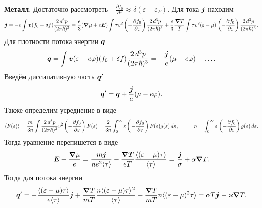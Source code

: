 \textbf{Металл}. Достаточно рассмотреть $- \frac{\partial f_0}{\partial \varepsilon} \approx \delta(\varepsilon - \varepsilon_F)$. Для тока $\boldsymbol{j}$ находим
\begin{equation*}
	\boldsymbol{j} = - e \int \boldsymbol{v} (f_0 + \delta f) \frac{2 \, d^3 p}{(2\pi \hbar)^3} = \frac{e}{3} (\boldsymbol{\nabla} \mu + e \boldsymbol{E}) \int \tau v^2 \left(
		- \frac{\partial f_0}{\partial \varepsilon} 
	\right) \frac{2 \, d^3 p}{(2\pi \hbar)^3} + \frac{e}{3} \frac{\boldsymbol{\nabla} T}{T} \int \tau v^2 (\varepsilon-\mu) \left(-\frac{\partial f_0}{\partial \varepsilon} \right) \frac{2 \, d^3 p}{(2\pi \hbar)^3}.
\end{equation*}
Для плотности потока энергии $\boldsymbol{q}$ 
\begin{equation*}
	\boldsymbol{q} = \int \boldsymbol{v} (\varepsilon- e \varphi) (f_0 + \delta f) \frac{2 \, d^3 p}{(2\pi \hbar)^3} = - \frac{\boldsymbol{j}}{e} (\mu - e \varphi) - \ldots.
\end{equation*}
Введём диссипативную часть $\boldsymbol{q}'$
\begin{equation*}
	\boldsymbol{q}' = \boldsymbol{q} + \frac{\boldsymbol{j}}{e} (\mu- e \varphi).
\end{equation*}
Также определим усреднение в виде
\begin{equation*}
	\langle F(\varepsilon)\rangle = \frac{m}{3n} \int \frac{2 \d^3 p}{(2 \pi \hbar)^3} v^2  \left(- \frac{\partial f_0}{\partial \varepsilon} \right)  F(\varepsilon) = \frac{2}{3n} \int_{0}^{\infty} \varepsilon \left(- \frac{\partial f_0}{\partial \varepsilon} \right) F(\varepsilon) g(\varepsilon) \d \varepsilon,
	\hspace{10 mm} 
	n = \int_{0}^{\infty} \varepsilon \left(- \frac{\partial f_0}{\partial \varepsilon} \right) g(\varepsilon) \d \varepsilon.
\end{equation*}
Тогда уравнение перепишется в виде
\begin{equation*}
	\boldsymbol{E} + \frac{\boldsymbol{\nabla} \mu}{e} = \frac{m \boldsymbol{j}}{n e^2 \langle \tau\rangle} - \frac{\boldsymbol{\nabla} T}{ e T} \frac{\langle (\varepsilon -\mu) \tau\rangle}{\langle \tau\rangle} = \frac{\boldsymbol{j}}{\sigma} + \alpha \boldsymbol{\nabla} T.
\end{equation*}
Тогда для потока энергии
\begin{equation*}
	\boldsymbol{q}' = - \frac{\langle (\varepsilon-\mu) \tau\rangle}{e \langle  \tau\rangle} \boldsymbol{j} + \frac{\boldsymbol{\nabla} T}{m T} \frac{n \langle (\varepsilon-\mu) \tau\rangle^2}{\langle \tau\rangle} - 
	\frac{\boldsymbol{\nabla} T}{m T} n \langle (\varepsilon-\mu)^2 \tau\rangle 
	= 
	\alpha T \boldsymbol{j} - \varkappa \boldsymbol{\nabla} T
	.
\end{equation*}
